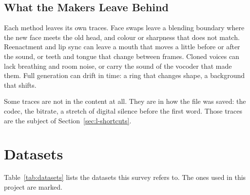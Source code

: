 \subsection{What the Makers Leave Behind}

Each method leaves its own traces. Face swaps leave a blending boundary where
the new face meets the old head, and colour or sharpness that does not match.
Reenactment and lip sync can leave a mouth that moves a little before or after
the sound, or teeth and tongue that change between frames. Cloned voices can
lack breathing and room noise, or carry the sound of the vocoder that made
them. Full generation can drift in time: a ring that changes shape, a
background that shifts.

Some traces are not in the content at all. They are in how the file was
saved: the codec, the bitrate, a stretch of digital silence before the first
word. Those traces are the subject of Section~\ref{sec:l-shortcuts}.

\section{Datasets}
\label{sec:l-datasets}

Table~\ref{tab:datasets} lists the datasets this survey refers to.
The ones used in this project are marked.

